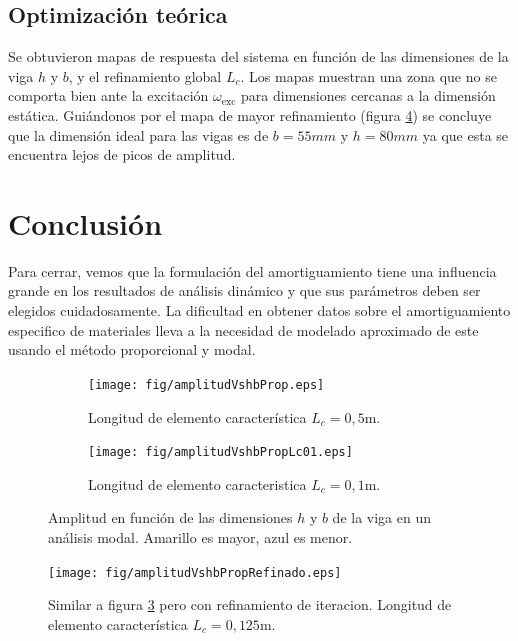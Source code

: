 \documentclass[onecolumn,10pt,titlepage,a4paper]{article}
\begin{document}
\subsection*{Optimización teórica}
Se obtuvieron mapas de respuesta del sistema en función de las dimensiones de la viga $h$ y $b$, y el refinamiento global $L_c$. Los mapas muestran una zona que no se comporta bien ante la excitación $\omega_{\mathrm{exc}}$ para dimensiones cercanas a la dimensión estática. Guiándonos por el mapa de mayor refinamiento (figura \ref{fig:amplitudVshbPropref}) se concluye que la dimensión ideal para las vigas es de $b=55mm$ y $h=80mm$ ya que esta se encuentra lejos de picos de amplitud.

\section{Conclusión}
Para cerrar, vemos que la formulación del amortiguamiento tiene una influencia grande en los resultados de análisis dinámico y que sus parámetros deben ser elegidos cuidadosamente. La dificultad en obtener datos sobre el amortiguamiento especifico de materiales lleva a la necesidad de modelado aproximado de este usando el método proporcional y modal.


\begin{figure}[htb!]
	\centering
	\begin{subfigure}{0.49\textwidth}
		\texttt{[image: fig/amplitudVshbProp.eps]}
		\caption{Longitud de elemento característica $L_c=0,5$m.}
		\label{fig:amplitudVshbProp}
	\end{subfigure}
	\hfill
	\begin{subfigure}{0.49\textwidth}
		\texttt{[image: fig/amplitudVshbPropLc01.eps]}
		\caption{Longitud de elemento caracteristica $L_c=0,1$m.}
		\label{fig:amplitudVshbProp}
	\end{subfigure}
	\caption{Amplitud en función de las dimensiones $h$ y $b$ de la viga en un análisis modal. Amarillo es mayor, azul es menor.}
\end{figure}

\begin{figure}[htb!]
	\centering
	\texttt{[image: fig/amplitudVshbPropRefinado.eps]}
	\caption{Similar a figura \ref{fig:amplitudVshbProp} pero con refinamiento de iteracion. Longitud de elemento característica $L_c=0,125$m.}
	\label{fig:amplitudVshbPropref}
\end{figure}




 
\end{document}

